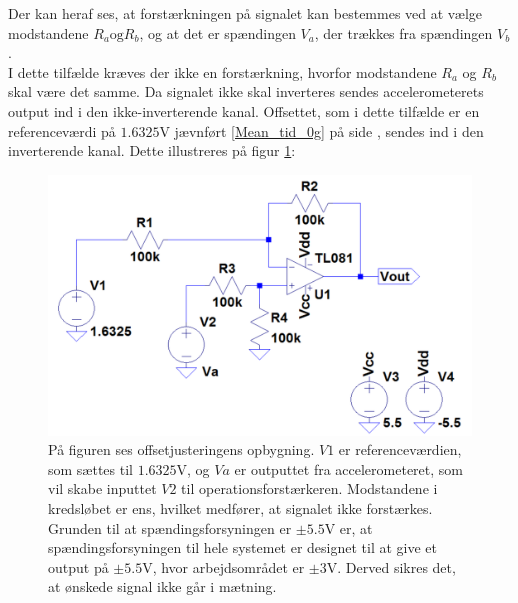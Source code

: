 \noindent Der kan heraf ses, at forstærkningen på signalet kan bestemmes ved at vælge modstandene $R_a \text{og} R_b$, og at det er spændingen $V_{a}$, der trækkes fra spændingen $V_{b}$. \\
I dette tilfælde kræves der ikke en forstærkning, hvorfor modstandene $R_{a}$ og $R_{b}$ skal være det samme. Da signalet ikke skal inverteres sendes accelerometerets output ind i den ikke-inverterende kanal. Offsettet, som i dette tilfælde er en referenceværdi på $1.6325$V jævnført \ref{Mean_tid_0g} på side \pageref{Mean_tid_0g}, sendes ind i den inverterende kanal. Dette illustreres på figur \ref{fig:Offset_generisk}:
\begin{figure}[H]
\centering
\includegraphics[scale=0.45]{figures/cProblemloesning/Offset_generisk.png}
\caption{På figuren ses offsetjusteringens opbygning. $V1$ er referenceværdien, som sættes til $1.6325$V, og $Va$ er outputtet fra accelerometeret, som vil skabe inputtet $V2$ til operationsforstærkeren. Modstandene i kredsløbet er ens, hvilket medfører, at signalet ikke forstærkes. Grunden til at spændingsforsyningen er $\pm5.5$V er, at spændingsforsyningen til hele systemet er designet til at give et output på $\pm5.5$V, hvor arbejdsområdet er $\pm3$V. Derved sikres det, at ønskede signal ikke går i mætning.}
\label{fig:Offset_generisk}
\end{figure}


